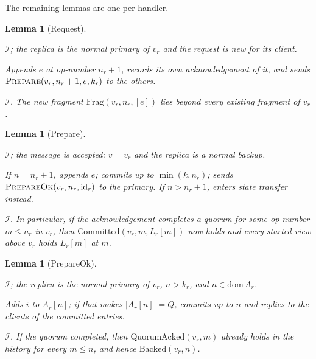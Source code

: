 \documentclass[11pt,a4paper]{article}
\theoremstyle{plain}
\newtheorem{lemma}[theorem]{Lemma}
\theoremstyle{definition}
\theoremstyle{remark}
\newcommand{\msg}[1]{\textsc{#1}}
\newcommand{\Inv}{\mathcal{I}}
\newcommand{\Frag}{\mathrm{Frag}}
\newcommand{\QuorumAcked}{\mathrm{QuorumAcked}}
\newcommand{\Committed}{\mathrm{Committed}}
\newcommand{\Backed}{\mathrm{Backed}}
\begin{document}
The remaining lemmas are one per handler.

\begin{lemma}[Request]
\label{lem:h-request}
\begin{iface}
  \item[Precondition] $\Inv$; the replica is the normal primary of $v_r$
    and the request is new for its client.
  \item[Effect] Appends $e$ at op-number $n_r + 1$, records its own
    acknowledgement of it, and sends $\msg{Prepare}(v_r, n_r+1, e, k_r)$
    to the others.
  \item[Guarantee] $\Inv$. The new fragment $\Frag(v_r, n_r, [e])$ lies
    beyond every existing fragment of $v_r$.
\end{iface}
\end{lemma}

\begin{lemma}[Prepare]
\label{lem:h-prepare}
\begin{iface}
  \item[Precondition] $\Inv$; the message is accepted: $v = v_r$ and the
    replica is a normal backup.
  \item[Effect] If $n = n_r + 1$, appends $e$; commits up to
    $\min(k, n_r)$; sends $\msg{PrepareOk}(v_r, n_r, \mathrm{id}_r)$ to
    the primary. If $n > n_r + 1$, enters state transfer instead.
  \item[Guarantee] $\Inv$. In particular, if the acknowledgement
    completes a quorum for some op-number $m \le n_r$ in $v_r$, then
    $\Committed(v_r, m, L_r[m])$ now holds and every started view above
    $v_r$ holds $L_r[m]$ at $m$.
\end{iface}
\end{lemma}

\begin{lemma}[PrepareOk]
\label{lem:h-prepareok}
\begin{iface}
  \item[Precondition] $\Inv$; the replica is the normal primary of
    $v_r$, $n > k_r$, and $n \in \mathrm{dom}\, A_r$.
  \item[Effect] Adds $i$ to $A_r[n]$; if that makes $|A_r[n]| = Q$,
    commits up to $n$ and replies to the clients of the committed
    entries.
  \item[Guarantee] $\Inv$. If the quorum completed, then
    $\QuorumAcked(v_r, m)$ already holds in the history for every
    $m \le n$, and hence $\Backed(v_r, n)$.
\end{iface}
\end{lemma}
\end{document}
